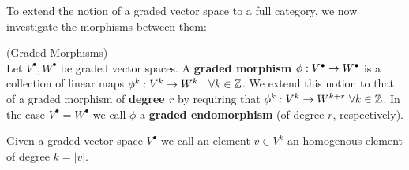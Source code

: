 To extend the notion of a graded vector space to a full category, we now investigate the morphisms between them:

\begin{definition} (Graded Morphisms)\\
 Let $V^\bullet, W^\bullet$ be graded vector spaces.  A \textbf{graded morphism} $\phi: V^\bullet \ra W^\bullet$ is  a collection of linear maps $\phi^k: V^k \ra W^k$ \ $\forall k \in \mathbb{Z}$. We extend this notion to that of a graded morphism of \textbf{degree $r$} by requiring that $\phi^k: V^k \ra W^{k+r}\ \forall k \in \ZZ$. In the case $V^\bullet = W^\bullet$ we call $\phi$ a \textbf{graded endomorphism} (of degree $r$, respectively).
\end{definition}

Given a graded vector space $V^\bullet$ we call an element $v\in V^k$ an homogenous element of degree $k=|v|$.


